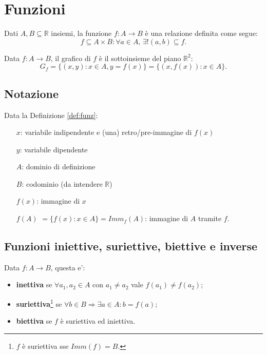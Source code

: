 \section{Funzioni}
\begin{definition}[Funzione]\label{def:funz}
    Dati $A, B\subseteq\mathbb R$ insiemi, la funzione $f\colon A\rightarrow B$ è una relazione definita come segue:
    \begin{equation*}
        f\subseteq A\times B:\forall a\in A,\, \exists! (a,b)\subseteq f.
    \end{equation*}
\end{definition}

\begin{definition}[Grafico di $f$]
    Data $f\colon A\rightarrow B$, il grafico di $f$ è il sottoinsieme del piano $\mathbb R^2$:
    \begin{equation*}
        G_f = \{(x,y)\colon x\in A, y = f(x)\} = \{(x,f(x))\colon x\in A\}.
    \end{equation*}
\end{definition}

\subsection{Notazione}
Data la Definizione \ref{def:funz}:
\begin{itemize}
    \item [$x$:] variabile indipendente e (una) retro/pre-immagine di $f(x)$
    \item[$y$:] variabile dipendente
    \item[$A$:] dominio di definizione
    \item[$B$:] codominio (da intendere $\mathbb R$)
    \item[$f(x)$:] immagine di $x$
    \item[$f(A)$]$=\{f(x)\colon x\in A\}=Imm_f(A)$: immagine di $A$ tramite $f$. 
\end{itemize}

\subsection{Funzioni iniettive, suriettive, biettive e inverse}

\begin{definition}
    Data $f\colon A\rightarrow B$, questa e':
    \begin{itemize}
        \item \textbf{inettiva} se $\forall a_1,a_2\in A$ con $a_1\neq a_2$ vale $f(a_1)\neq f(a_2)$;
        \item \textbf{suriettiva}\footnote{$f$ è suriettiva sse $Imm(f)=B$.} se $\forall b\in B\Rightarrow\exists a\in A\colon b=f(a)$;
        \item \textbf{biettiva} se $f$ è suriettiva ed iniettiva.
    \end{itemize}
\end{definition}

